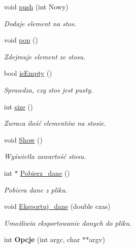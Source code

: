 \begin{DoxyCompactItemize}
\item 
void \hyperlink{class_stos_a918b4f40664e1637dd3ef8e7e9386b24}{push} (int \-Nowy)
\begin{DoxyCompactList}\small\item\em \-Dodaje element na stos. \end{DoxyCompactList}\item 
void \hyperlink{class_stos_a88b0da41b49ef4d4b63cfd4924665683}{pop} ()
\begin{DoxyCompactList}\small\item\em \-Zdejmuje element ze stosu. \end{DoxyCompactList}\item 
bool \hyperlink{class_stos_a328eb30ceb157893dead1a9fe17597b7}{is\-Empty} ()
\begin{DoxyCompactList}\small\item\em \-Sprawdza, czy stos jest pusty. \end{DoxyCompactList}\item 
int \hyperlink{class_stos_a696195d5125d9bbe6b491bc5985f9461}{size} ()
\begin{DoxyCompactList}\small\item\em \-Zwraca ilość elementów na stosie. \end{DoxyCompactList}\item 
void \hyperlink{class_stos_abfb03d80298013a2792bde2fd89c3863}{\-Show} ()
\begin{DoxyCompactList}\small\item\em \-Wyświetla zawartość stosu. \end{DoxyCompactList}\item 
int $\ast$ \hyperlink{class_stos_aa395f48db2ae1b92ac06c1eb566860df}{\-Pobierz\-\_\-dane} ()
\begin{DoxyCompactList}\small\item\em \-Pobiera dane z pliku. \end{DoxyCompactList}\item 
void \hyperlink{class_stos_a757f4fb37152efb0e8600ef45284a2a6}{\-Eksportuj\-\_\-dane} (double czas)
\begin{DoxyCompactList}\small\item\em \-Umożliwia eksportowanie danych do pliku. \end{DoxyCompactList}\item 
\hypertarget{class_stos_a81d2131accae45a38028da700bb6cf18}{int {\bfseries \-Opcje} (int argc, char $\ast$$\ast$argv)}\label{class_stos_a81d2131accae45a38028da700bb6cf18}

\end{DoxyCompactItemize}
